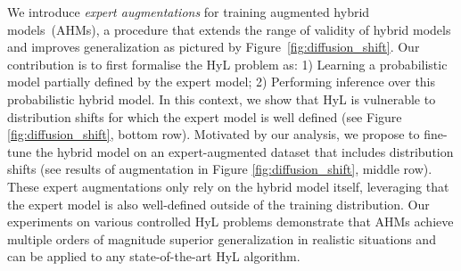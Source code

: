 \documentclass{article}
\newcommand\figref{Figure~\ref}
\begin{document}
We introduce \textit{expert augmentations} for training augmented hybrid models~(AHMs), a procedure that extends the range of validity of hybrid models and improves generalization as pictured by \figref{fig:diffusion_shift}. Our contribution is to first formalise the HyL problem as: 1) Learning a probabilistic model partially defined by the expert model; 2) Performing inference over this probabilistic hybrid model. In this context, we show that HyL is vulnerable to distribution shifts for which the expert model is well defined (see Figure \ref{fig:diffusion_shift}, bottom row). Motivated by our analysis, we propose to fine-tune the hybrid model on an expert-augmented dataset that includes distribution shifts (see results of augmentation in Figure \ref{fig:diffusion_shift}, middle row). These expert augmentations only rely on the hybrid model itself, leveraging that the expert model is also well-defined outside of the training distribution. Our experiments on various controlled HyL problems demonstrate that AHMs achieve multiple orders of magnitude superior generalization in realistic situations and can be applied to any state-of-the-art HyL algorithm.

\end{document}
